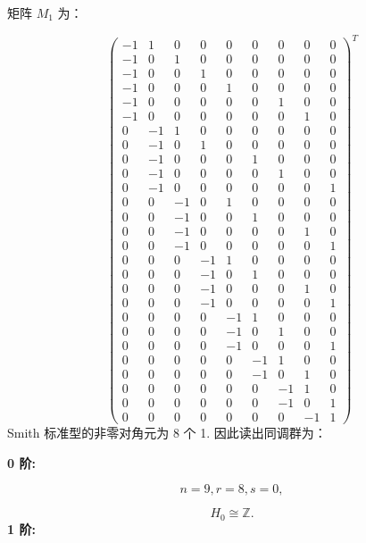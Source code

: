 \documentclass[UTF8]{ctexart}
\begin{document}
矩阵 $M_{1}$ 为：

\[
\left(\begin{array}{ccccccccc}
-1 & 1 & 0 & 0 & 0 & 0 & 0 & 0 & 0\\
-1 & 0 & 1 & 0 & 0 & 0 & 0 & 0 & 0\\
-1 & 0 & 0 & 1 & 0 & 0 & 0 & 0 & 0\\
-1 & 0 & 0 & 0 & 1 & 0 & 0 & 0 & 0\\
-1 & 0 & 0 & 0 & 0 & 0 & 1 & 0 & 0\\
-1 & 0 & 0 & 0 & 0 & 0 & 0 & 1 & 0\\
0 & -1 & 1 & 0 & 0 & 0 & 0 & 0 & 0\\
0 & -1 & 0 & 1 & 0 & 0 & 0 & 0 & 0\\
0 & -1 & 0 & 0 & 0 & 1 & 0 & 0 & 0\\
0 & -1 & 0 & 0 & 0 & 0 & 1 & 0 & 0\\
0 & -1 & 0 & 0 & 0 & 0 & 0 & 0 & 1\\
0 & 0 & -1 & 0 & 1 & 0 & 0 & 0 & 0\\
0 & 0 & -1 & 0 & 0 & 1 & 0 & 0 & 0\\
0 & 0 & -1 & 0 & 0 & 0 & 0 & 1 & 0\\
0 & 0 & -1 & 0 & 0 & 0 & 0 & 0 & 1\\
0 & 0 & 0 & -1 & 1 & 0 & 0 & 0 & 0\\
0 & 0 & 0 & -1 & 0 & 1 & 0 & 0 & 0\\
0 & 0 & 0 & -1 & 0 & 0 & 0 & 1 & 0\\
0 & 0 & 0 & -1 & 0 & 0 & 0 & 0 & 1\\
0 & 0 & 0 & 0 & -1 & 1 & 0 & 0 & 0\\
0 & 0 & 0 & 0 & -1 & 0 & 1 & 0 & 0\\
0 & 0 & 0 & 0 & -1 & 0 & 0 & 0 & 1\\
0 & 0 & 0 & 0 & 0 & -1 & 1 & 0 & 0\\
0 & 0 & 0 & 0 & 0 & -1 & 0 & 1 & 0\\
0 & 0 & 0 & 0 & 0 & 0 & -1 & 1 & 0\\
0 & 0 & 0 & 0 & 0 & 0 & -1 & 0 & 1\\
0 & 0 & 0 & 0 & 0 & 0 & 0 & -1 & 1
\end{array}\right)^{T}
\]
Smith 标准型的非零对角元为 8 个 1. 因此读出同调群为：

\noindent
\textbf{0 阶:}

\begin{equation}
n=9,r=8,s=0,
\end{equation}

\begin{equation}
H_{0}\cong\mathbb{Z}.
\end{equation}
\textbf{1 阶:}
\end{document}
